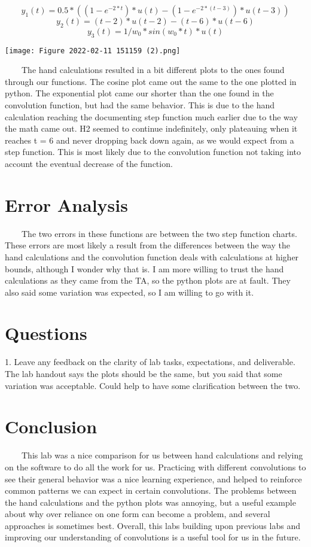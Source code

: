 \documentclass[11pt,a4]{article}
\begin{document}
$$y_1(t) = 0.5*((1-e^{-2*t})*u(t)-(1-e^{-2*(t-3)})*u(t-3))$$
$$y_2(t) = (t-2)*u(t-2)-(t-6)*u(t-6)$$
$$y_3(t) = 1/w_0*sin(w_0*t)*u(t)$$

\texttt{[image: Figure 2022-02-11 151159 (2).png]}

\ \ \ \ The hand calculations resulted in a bit different plots to the ones found through our functions. The cosine plot came out the same to the one plotted in python. The exponential plot came our shorter than the one found in the convolution function, but had the same behavior. This is due to the hand calculation reaching the documenting step function much earlier due to the way the math came out. H2 seemed to continue indefinitely, only plateauing when it reaches t = 6 and never dropping back down again, as we would expect from a step function. This is most likely due to the convolution function not taking into account the eventual decrease of the function.

\section{Error Analysis}
\ \ \ \ The two errors in these functions are between the two step function charts. These errors are most likely a result from the differences between the way the hand calculations and the convolution function deals with calculations at higher bounds, although I wonder why that is. I am more willing to trust the hand calculations as they came from the TA, so the python plots are at fault. They also said some variation was expected, so I am willing to go with it.

\section{Questions}
1. Leave any feedback on the clarity of lab tasks, expectations, and deliverable.
\\ The lab handout says the plots should be the same, but you said that some variation was acceptable. Could help to have some clarification between the two.


\section{Conclusion}
\ \ \ \ This lab was a nice comparison for us between hand calculations and relying on the software to do all the work for us. Practicing with different convolutions to see their general behavior was a nice learning experience, and helped to reinforce common patterns we can expect in certain convolutions. The problems between the hand calculations and the python plots was annoying, but a useful example about why over reliance on one form can become a problem, and several approaches is sometimes best. Overall, this labs building upon previous labs and improving our understanding of convolutions is a useful tool for us in the future.
\end{document}
